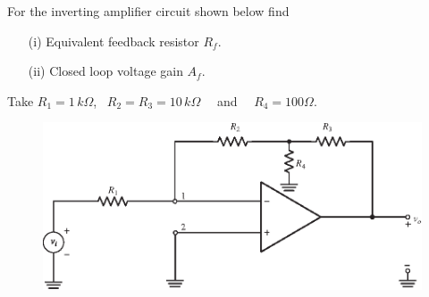 \eject


\begin{example}\label{exam5.10}
For the inverting amplifier circuit shown below find
\begin{itemize}
\item[(i)] Equivalent feedback resistor $R_{f}$.

\item[(ii)] Closed loop voltage gain $A_{f}$.
\end{itemize}
Take $R_{1}=1\, k\Omega$, \ $R_{2}=R_{3}=10\, k\Omega$ \ \ and \ \ $R_{4}=100\Omega$.
\begin{figure}[H]
\centering
\includegraphics{chap4/S3-EE-06-IN005.eps}
\end{figure}
\end{example}

